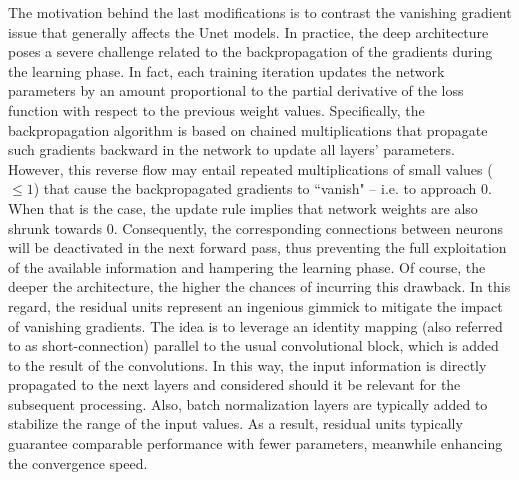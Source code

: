 The motivation behind the last modifications is to contrast the vanishing gradient \cite{vanishing_gradient} issue that generally affects the Unet models.
In practice, the deep architecture poses a severe challenge related to the backpropagation of the gradients during the learning phase.
In fact, each training iteration updates the network parameters by an amount proportional to the partial derivative of the loss function with respect to the previous weight values.
Specifically, the backpropagation algorithm is based on chained multiplications that propagate such gradients backward in the network to update all layers' parameters.
However, this reverse flow may entail repeated multiplications of small values ($\leq1$) that cause the backpropagated gradients to ``vanish" -- i.e. to approach 0.
When that is the case, the update rule implies that network weights are also shrunk towards 0.
Consequently, the corresponding connections between neurons will be deactivated in the next forward pass, thus preventing the full exploitation of the available information and hampering the learning phase.
Of course, the deeper the architecture, the higher the chances of incurring this drawback.
In this regard, the residual units represent an ingenious gimmick to mitigate the impact of vanishing gradients.
The idea is to leverage an identity mapping (also referred to as short-connection) parallel to the usual convolutional block, which is added to the result of the convolutions. 
In this way, the input information is directly propagated to the next layers and considered should it be relevant for the subsequent processing.
Also, batch normalization layers are typically added to stabilize the range of the input values.
As a result, residual units typically guarantee comparable performance with fewer parameters, meanwhile enhancing the convergence speed.

